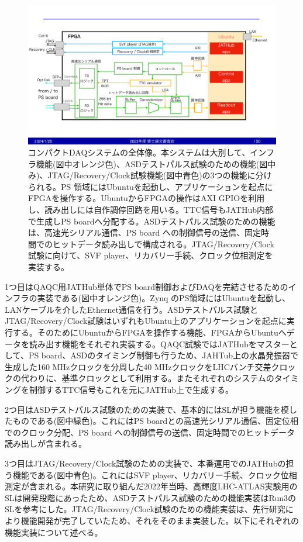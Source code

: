 \begin{figure} 
\centering
\includegraphics[width=16cm]{fig/QAQC/QAQCoverall.pdf}
\caption[コンパクトDAQシステムの全体像]{コンパクトDAQシステムの全体像。本システムは大別して、インフラ機能(図中オレンジ色)、ASDテストパルス試験のための機能(図中み)、JTAG/Recovery/Clock試験機能(図中青色)の3つの機能に分けられる。PS 領域にはUbuntuを起動し、アプリケーションを起点にFPGAを操作する。UbuntuからFPGAの操作はAXI GPIOを利用し、読み出しには自作調停回路を用いる。TTC信号もJATHub内部で生成しPS boardへ分配する。ASDテストパルス試験のための機能は、高速光シリアル通信、PS board への制御信号の送信、固定時間でのヒットデータ読み出しで構成される。JTAG/Recovery/Clock試験に向けて、SVF player、リカバリー手続、クロック位相測定を実装する。}
\label{fig_CTA}
\end{figure}

1つ目はQAQC用JATHub単体でPS board制御およびDAQを完結させるためのインフラの実装である(図中オレンジ色)。Zynq のPS領域にはUbuntuを起動し、LANケーブルを介したEthernet通信を行う。ASDテストパルス試験とJTAG/Recovery/Clock試験はいずれもUbuntu上のアプリケーションを起点に実行する。そのためにUbuntuからFPGAを操作する機能、FPGAからUbuntuへデータを読み出す機能をそれぞれ実装する。QAQC試験ではJATHubをマスターとして、PS board、ASDのタイミング制御も行うため、JAHTub上の水晶発振器で生成した160 MHzクロックを分周した40 MHzクロックをLHCバンチ交差クロックの代わりに、基準クロックとして利用する。またそれぞれのシステムのタイミングを制御するTTC信号もこれを元にJATHub上で生成する。

2つ目はASDテストパルス試験のための実装で、基本的にはSLが担う機能を模したものである(図中緑色)。これにはPS boardとの高速光シリアル通信、固定位相でのクロック分配、PS board への制御信号の送信、固定時間でのヒットデータ読み出しが含まれる。

3つ目はJTAG/Recovery/Clock試験のための実装で、本番運用でのJATHubの担う機能である(図中青色)。これにはSVF player、リカバリー手続、クロック位相測定が含まれる。本研究に取り組んだ2022年当時、高輝度LHC-ATLAS実験用のSLは開発段階にあったため、ASDテストパルス試験のための機能実装はRun3のSLを参考にした。JTAG/Recovery/Clock試験のための機能実装は、先行研究\cite{mt_atanaka}により機能開発が完了していたため、それをそのまま実装した。以下にそれぞれの機能実装について述べる。

